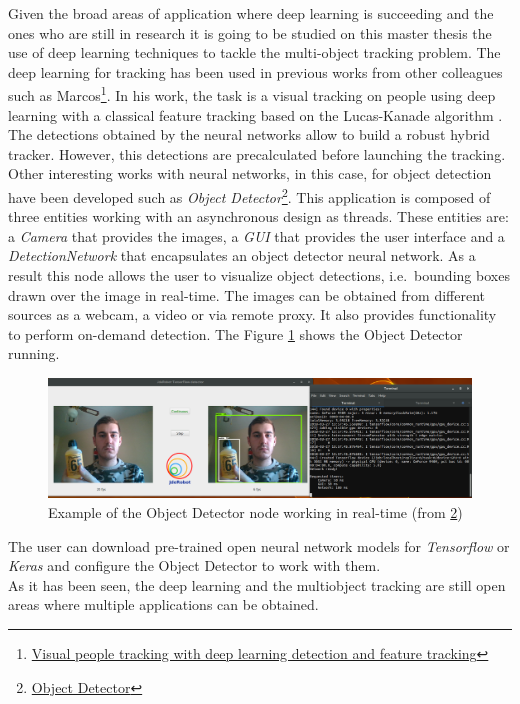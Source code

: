 Given the broad areas of application where deep learning is succeeding and the ones who are still in research it is going to be studied on this master thesis the use of deep learning techniques to tackle the multi-object tracking problem.
The deep learning for tracking has been used in previous works from other colleagues such as Marcos\footnote{\href{https://gsyc.urjc.es/jmplaza/students/tfm-visualtracking-marcos_pieras-2017.pdf}{Visual people tracking with deep learning
detection and feature tracking}}. In his work, the task is a visual tracking on people using deep learning with a classical feature tracking based on the Lucas-Kanade algorithm \cite{baker2004lucas}. The detections obtained by the neural networks allow to build a robust hybrid tracker. However, this detections are precalculated before launching the tracking.\\
Other interesting works with neural networks, in this case, for object detection have been developed such as \textit{Object Detector}\footnote {\label{object_detector}\href{https://github.com/JdeRobot/dl-objectdetector}{Object Detector}}.
This application is composed of three entities working with an asynchronous design as threads. These entities are: a \textit{Camera} that provides the images, a \textit{GUI} that provides the user interface and a \textit{DetectionNetwork} that encapsulates an object detector neural network. As a result this node allows the user to visualize object detections, i.e.\ bounding boxes drawn over the image in real-time. The images can be obtained from different sources as a webcam, a video or via remote proxy. It also provides functionality to perform on-demand detection. The Figure \ref{fig:object_detector} shows the Object Detector running.
\begin{figure}[H]
\begin{center}
\includegraphics[scale=0.25]{figures/object_detector.png}
\caption{Example of the Object Detector node working in real-time (from \ref{object_detector})}
\label{fig:object_detector}
\end{center}
\end{figure}
The user can download pre-trained open neural network models for \textit{Tensorflow} or \textit{Keras} and configure the Object Detector to work with them.\\
As it has been seen, the deep learning and the multiobject tracking are still open areas where multiple applications can be obtained.\\
